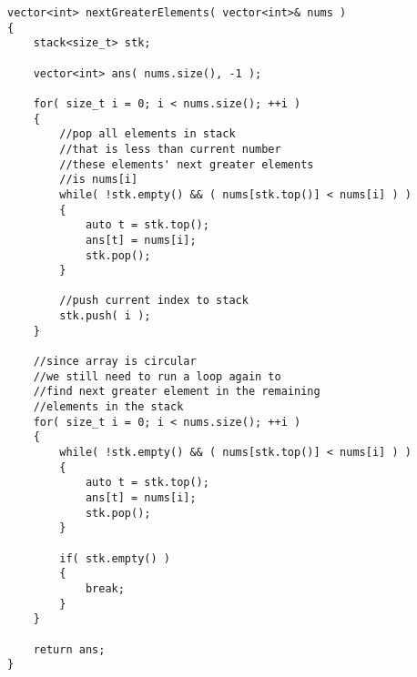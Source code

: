 \setcounter{lstlisting}{0}
\begin{lstlisting}[style=customc, caption={Stack}]
vector<int> nextGreaterElements( vector<int>& nums )
{
    stack<size_t> stk;

    vector<int> ans( nums.size(), -1 );

    for( size_t i = 0; i < nums.size(); ++i )
    {
        //pop all elements in stack
        //that is less than current number
        //these elements' next greater elements
        //is nums[i]
        while( !stk.empty() && ( nums[stk.top()] < nums[i] ) )
        {
            auto t = stk.top();
            ans[t] = nums[i];
            stk.pop();
        }

        //push current index to stack
        stk.push( i );
    }

    //since array is circular
    //we still need to run a loop again to
    //find next greater element in the remaining
    //elements in the stack
    for( size_t i = 0; i < nums.size(); ++i )
    {
        while( !stk.empty() && ( nums[stk.top()] < nums[i] ) )
        {
            auto t = stk.top();
            ans[t] = nums[i];
            stk.pop();
        }

        if( stk.empty() )
        {
            break;
        }
    }

    return ans;
}
\end{lstlisting}